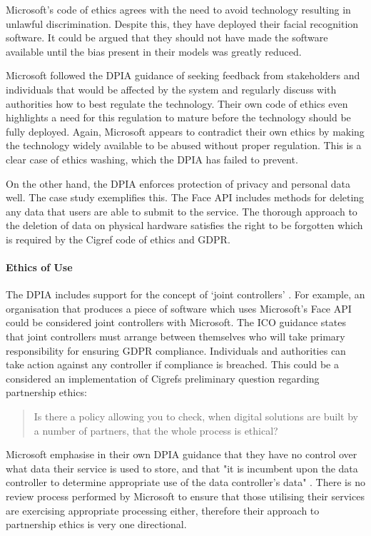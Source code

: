 \documentclass[12pt]{extarticle}
\begin{document}
Microsoft's code of ethics agrees with the need to avoid technology resulting in unlawful discrimination. 
Despite this, they have deployed their facial recognition software. 
It could be argued that they should not have made the software available until the bias present in their models was greatly reduced.

Microsoft followed the DPIA guidance of seeking feedback from stakeholders and individuals that would be affected by the system and regularly discuss with authorities how to best regulate the technology. 
Their own code of ethics even highlights a need for this regulation to mature before the technology should be fully deployed.
Again, Microsoft appears to contradict their own ethics by making the technology widely available to be abused without proper regulation.
This is a clear case of ethics washing, which the DPIA has failed to prevent.

On the other hand, the DPIA enforces protection of privacy and personal data well. The case study exemplifies this. 
The Face API includes methods for deleting any data that users are able to submit to the service.
The thorough approach to the deletion of data on physical hardware satisfies the right to be forgotten which is required by the Cigref code of ethics and GDPR.

\paragraph{Ethics of Use}
The DPIA includes support for the concept of `joint controllers' \cite{controllers}. 
For example, an organisation that produces a piece of software which uses Microsoft's Face API could be considered joint controllers with Microsoft. 
The ICO guidance states that joint controllers must arrange between themselves who will take primary responsibility for ensuring GDPR compliance. 
Individuals and authorities can take action against any controller if compliance is breached. 
This could be a considered an implementation of Cigrefs preliminary question regarding partnership ethics: 
\begin{quote}
    \centering
    Is there a policy allowing you to check, when digital solutions are built by a number of partners, that the whole process is ethical?
\end{quote} 
Microsoft emphasise in their own DPIA guidance that they have no control over what data their service is used to store, and that "it is incumbent upon the data controller to determine appropriate use of the data controller's data" \cite{robmazz}.
There is no review process performed by Microsoft to ensure that those utilising their services are exercising appropriate processing either, therefore their approach to partnership ethics is very one directional.
\end{document}
